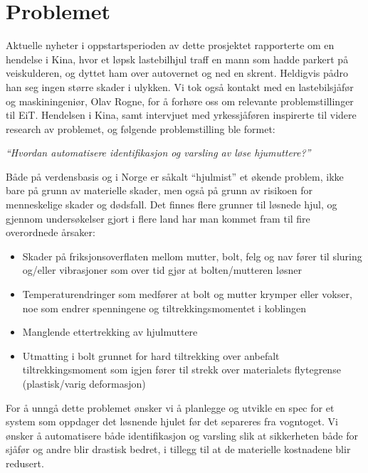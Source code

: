 \section{Problemet}

Aktuelle nyheter i oppstartsperioden av dette prosjektet rapporterte om en 
hendelse i Kina, hvor et løpsk lastebilhjul traff en mann som hadde parkert på 
veiskulderen, og dyttet ham over autovernet og ned en skrent. Heldigvis pådro 
han seg ingen større skader i ulykken. Vi tok også kontakt med en lastebilsjåfør
 og maskiningeniør, Olav Rogne, for å forhøre oss om relevante problemstillinger 
til EiT. Hendelsen i Kina, samt intervjuet med yrkessjåføren inspirerte til videre
research av problemet, og følgende problemstilling ble formet:

\begin{center}
\emph{``Hvordan automatisere identifikasjon og varsling av løse hjumuttere?''}
\end{center}

Både på verdensbasis og i Norge er såkalt ``hjulmist'' et økende problem, ikke bare 
på grunn av materielle skader, men også på grunn av risikoen for menneskelige 
skader og dødsfall. Det finnes flere grunner til løsnede hjul, og gjennom undersøkelser 
gjort i flere land har man kommet fram til fire overordnede årsaker:

\begin{itemize}
\item{ Skader på friksjonsoverflaten mellom mutter, bolt, felg og nav fører til sluring og/eller
vibrasjoner som over tid gjør at bolten/mutteren løsner}
\item { Temperaturendringer som medfører at bolt og mutter krymper eller vokser, noe som 
endrer spenningene og tiltrekkingsmomentet i koblingen}
\item{ Manglende ettertrekking av hjulmuttere}
\item{ Utmatting i bolt grunnet for hard tiltrekking over anbefalt tiltrekkingsmoment som igjen 
fører til strekk over materialets flytegrense (plastisk/varig deformasjon)}
\end{itemize}

For å unngå dette problemet ønsker vi å planlegge og utvikle en spec for et system som oppdager 
det løsnende hjulet før det separeres fra vogntoget. Vi ønsker å automatisere både identifikasjon
og varsling slik at sikkerheten både for sjåfør og andre blir drastisk bedret, i tillegg til at de materielle
kostnadene blir redusert.

